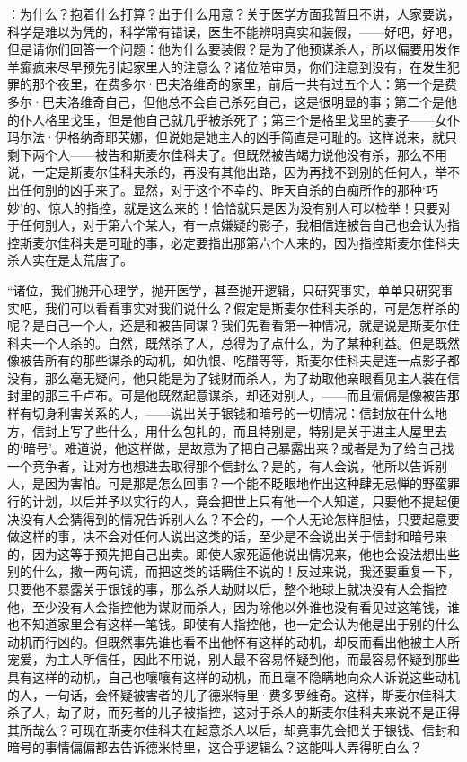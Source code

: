 ：为什么？抱着什么打算？出于什么用意？关于医学方面我暂且不讲，人家要说，科学是难以为凭的，科学常有错误，医生不能辨明真实和装假，——好吧，好吧，但是请你们回答一个问题：他为什么要装假？是为了他预谋杀人，所以偏要用发作羊癫疯来尽早预先引起家里人的注意么？诸位陪审员，你们注意到没有，在发生犯罪的那个夜里，在费多尔·巴夫洛维奇的家里，前后一共有过五个人：第一个是费多尔·巴夫洛维奇自己，但他总不会自己杀死自己，这是很明显的事；第二个是他的仆人格里戈里，但是他自己就几乎被杀死了；第三个是格里戈里的妻子——女仆玛尔法·伊格纳奇耶芙娜，但说她是她主人的凶手简直是可耻的。这样说来，就只剩下两个人——被告和斯麦尔佳科夫了。但既然被告竭力说他没有杀，那么不用说，一定是斯麦尔佳科夫杀的，再没有其他出路，因为再找不到别的任何人，举不出任何别的凶手来了。显然，对于这个不幸的、昨天自杀的白痴所作的那种‘巧妙’的、惊人的指控，就是这么来的！恰恰就只是因为没有别人可以检举！只要对于任何别人，对于第六个某人，有一点嫌疑的影子，我相信连被告自己也会认为指控斯麦尔佳科夫是可耻的事，必定要指出那第六个人来的，因为指控斯麦尔佳科夫杀人实在是太荒唐了。
\par “诸位，我们抛开心理学，抛开医学，甚至抛开逻辑，只研究事实，单单只研究事实吧，我们可以看看事实对我们说什么？假定是斯麦尔佳科夫杀的，可是怎样杀的呢？是自己一个人，还是和被告同谋？我们先看看第一种情况，就是说是斯麦尔佳科夫一个人杀的。自然，既然杀了人，总得为了点什么，为了某种利益。但是既然像被告所有的那些谋杀的动机，如仇恨、吃醋等等，斯麦尔佳科夫是连一点影子都没有，那么毫无疑问，他只能是为了钱财而杀人，为了劫取他亲眼看见主人装在信封里的那三千卢布。可是他既然起意谋杀，却还对别人，——而且偏偏是像被告那样有切身利害关系的人，——说出关于银钱和暗号的一切情况：信封放在什么地方，信封上写了些什么，用什么包扎的，而且特别是，特别是关于进主人屋里去的‘暗号’。难道说，他这样做，是故意为了把自己暴露出来？或者是为了给自己找一个竞争者，让对方也想进去取得那个信封么？是的，有人会说，他所以告诉别人，是因为害怕。可是那是怎么回事？一个能不眨眼地作出这种肆无忌惮的野蛮罪行的计划，以后并予以实行的人，竟会把世上只有他一个人知道，只要他不提起便决没有人会猜得到的情况告诉别人么？不会的，一个人无论怎样胆怯，只要起意要做这样的事，决不会对任何人说出这类的话，至少是不会说出关于信封和暗号来的，因为这等于预先把自己出卖。即使人家死逼他说出情况来，他也会设法想出些别的什么，撒一两句谎，而把这类的话瞒住不说的！反过来说，我还要重复一下，只要他不暴露关于银钱的事，那么杀人劫财以后，整个地球上就决没有人会指控他，至少没有人会指控他为谋财而杀人，因为除他以外谁也没有看见过这笔钱，谁也不知道家里会有这样一笔钱。即使有人指控他，也一定会认为他是出于别的什么动机而行凶的。但既然事先谁也看不出他怀有这样的动机，却反而看出他被主人所宠爱，为主人所信任，因此不用说，别人最不容易怀疑到他，而最容易怀疑到那些具有这样的动机，自己也嚷嚷有这样的动机，而且毫不隐瞒地向众人诉说这些动机的人，一句话，会怀疑被害者的儿子德米特里·费多罗维奇。这样，斯麦尔佳科夫杀了人，劫了财，而死者的儿子被指控，这对于杀人的斯麦尔佳科夫来说不是正得其所哉么？可现在斯麦尔佳科夫在起意杀人以后，却竟事先会把关于银钱、信封和暗号的事情偏偏都去告诉德米特里，这合乎逻辑么？这能叫人弄得明白么？
